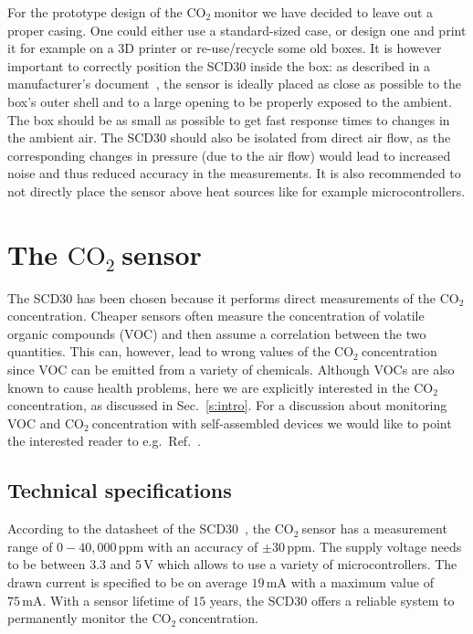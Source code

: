 \documentclass[12pt,a4paper]{article}
\newcommand{\coo}{\ensuremath{\mathrm{CO_2}~}}
\begin{document}
For the prototype design of the \coo monitor we have decided to leave out a proper casing. One could either use a standard-sized case, or design one and print it for example on a 3D printer or re-use/recycle some old boxes. It is however important to correctly position the SCD30 inside the box: as described in a manufacturer's document~\cite{SENSIRION2020A}, the sensor is ideally placed as close as possible to the box's outer shell and to a large opening to be properly exposed to the ambient. The box should be as small as possible to get fast response times to changes in the ambient air. The SCD30 should also be isolated from direct air flow, as the corresponding changes in pressure (due to the air flow) would lead to increased noise and thus reduced accuracy in the measurements. It is also recommended to not directly place the sensor above heat sources like for example microcontrollers.


\section{The \coo sensor}\label{s:SCD30}
The SCD30 has been chosen because it performs direct measurements of the \coo concentration. Cheaper sensors often measure the concentration of volatile organic compounds (VOC) and then assume a correlation between the two quantities. This can, however, lead to wrong values of the \coo concentration since VOC can be emitted from a variety of chemicals. Although VOCs are also known to cause health problems, here we are explicitly interested in the \coo concentration, as discussed in Sec.~\ref{s:intro}. For a discussion about monitoring VOC and \coo concentration with self-assembled devices we would like to point the interested reader 
to e.g.\ Ref.~\cite{CHIESA2019}.

\subsection{Technical specifications}
According to the datasheet of the SCD30~\cite{SENSIRION2020B}, the \coo sensor has a measurement range of $0 - 40,000\,\mathrm{ppm}$ with an accuracy of $\pm 30\,\mathrm{ppm}$.
The supply voltage needs to be between $3.3$ and $5\,\mathrm{V}$ which allows to use a variety of microcontrollers. The drawn current is specified to be on average $19\,\mathrm{mA}$ with a maximum value of $75\,\mathrm{mA}$. With a sensor lifetime of $15$ years, the SCD30 offers a reliable system to permanently monitor the \coo concentration.
\end{document}
